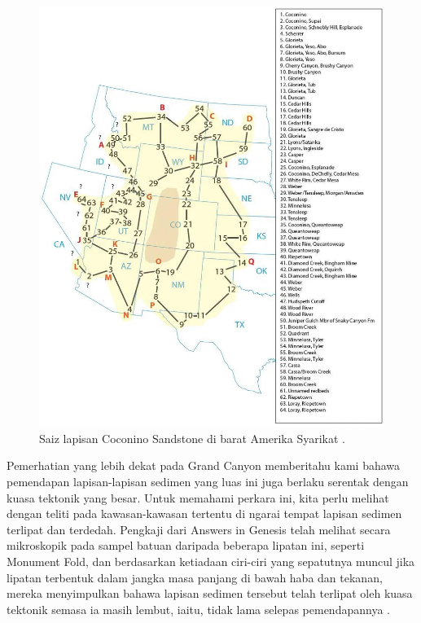\documentclass[10pt,twocolumn,letterpaper]{article}
\begin{document}
\begin{figure}[t]
\begin{center}
   \includegraphics[width=1\linewidth]{coconino.jpg}
\end{center}
   \caption{Saiz lapisan Coconino Sandstone di barat Amerika Syarikat \cite{21}.}
\label{fig:3}
\label{fig:onecol}
\end{figure}

Pemerhatian yang lebih dekat pada Grand Canyon memberitahu kami bahawa pemendapan lapisan-lapisan sedimen yang luas ini juga berlaku serentak dengan kuasa tektonik yang besar. Untuk memahami perkara ini, kita perlu melihat dengan teliti pada kawasan-kawasan tertentu di ngarai tempat lapisan sedimen terlipat dan terdedah. Pengkaji dari Answers in Genesis \cite{42} telah melihat secara mikroskopik pada sampel batuan daripada beberapa lipatan ini, seperti Monument Fold, dan berdasarkan ketiadaan ciri-ciri yang sepatutnya muncul jika lipatan terbentuk dalam jangka masa panjang di bawah haba dan tekanan, mereka menyimpulkan bahawa lapisan sedimen tersebut telah terlipat oleh kuasa tektonik semasa ia masih lembut, iaitu, tidak lama selepas pemendapannya \cite{43}.
\end{document}

